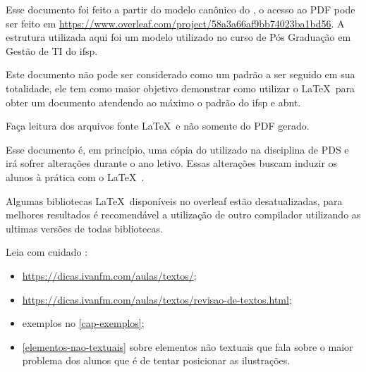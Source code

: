 \newcommand{\urlmodelosimples}{https://www.overleaf.com/project/58a3a66af9bb74023ba1bd56}

\newcommand{\urlmodelo}{\url{\urlmodelosimples}}

Esse documento foi feito a partir do modelo canônico do \abnTeX, o acesso ao PDF pode ser feito em 
\urlmodelo. A estrutura utilizada aqui foi um modelo utilizado no curso de Pós Graduação em Gestão de TI do \ac{ifsp}.


Este documento não pode ser considerado como um padrão a ser seguido em sua totalidade, ele tem como maior objetivo demonstrar como utilizar o \LaTeX\ para obter um documento atendendo ao máximo o padrão do \ac{ifsp} e \ac{abnt}.

Faça leitura dos arquivos fonte \LaTeX\ e não somente do PDF gerado.

Esse documento é, em princípio, uma cópia do utilizado na disciplina de PDS e irá sofrer alterações durante o ano letivo. Essas alterações buscam induzir os alunos à prática com o \LaTeX\ . 

Algumas bibliotecas \LaTeX\ disponíveis no overleaf estão desatualizadas, para melhores resultados é recomendável a utilização de outro compilador utilizando as ultimas versões de todas bibliotecas.

Leia com cuidado :
\begin{itemize}
    \item \url{https://dicas.ivanfm.com/aulas/textos/};
    \item \url{https://dicas.ivanfm.com/aulas/textos/revisao-de-textos.html};
    \item exemplos no \autoref{cap-exemplos};
    \item \autoref{elementos-nao-textuais} sobre elementos não textuais que fala sobre o maior problema dos alunos que é de tentar posicionar as ilustrações.
\end{itemize}

\noindent\hrulefill